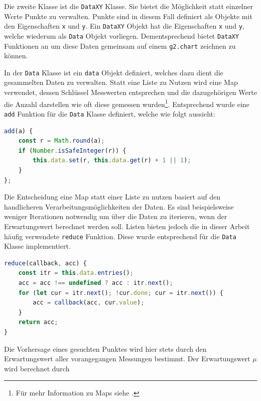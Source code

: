Die zweite Klasse ist die \lstinline{DataXY} Klasse.
Sie bietet die Möglichkeit statt einzelner Werte Punkte zu verwalten.
Punkte sind in diesem Fall definiert als Objekte mit den Eigenschaften \lstinline{x} und \lstinline{y}.
Ein \lstinline{DataXY} Objekt hat die Eigenschaften \lstinline{x} und \lstinline{y}, welche wiederum als \lstinline{Data} Objekt vorliegen.
Dementsprechend bietet \lstinline{DataXY} Funktionen an um diese Daten gemeinsam auf einem \lstinline{g2.chart} zeichnen zu können.

In der \lstinline{Data} Klasse ist ein \lstinline{data} Objekt definiert, welches dazu dient die gesammelten Daten zu verwalten.
Statt eine Liste zu Nutzen wird eine Map verwendet, dessen Schlüssel Messwerten entsprechen und die dazugehörigen Werte die Anzahl darstellen wie oft diese gemessen wurden\footnote{Für mehr Information zu Maps siehe .}.
Entsprechend wurde eine \lstinline{add} Funktion für die \lstinline{Data} Klasse definiert, welche wie folgt aussieht:

\begin{lstlisting}[language=JavaScript, caption={Definition der \lstinline{add} Funktion welche dazu genutzt wird der \lstinline{Data} Klasse neue Werte hinzuzufügen}, label={lst:data_add}]
add(a) {
    const r = Math.round(a);
    if (Number.isSafeInteger(r)) {
        this.data.set(r, this.data.get(r) + 1 || 1);
    }
};
\end{lstlisting}

Die Entscheidung eine Map statt einer Liste zu nutzen basiert auf den handlicheren Verarbeitungsmöglichkeiten der Daten.
Es sind beispielsweise weniger Iterationen notwendig um über die Daten zu iterieren, wenn der Erwartungswert berechnet werden soll.
Listen bieten jedoch die in dieser Arbeit häufig verwendete \lstinline{reduce} Funktion.
Diese wurde entsprechend für die \lstinline{Data} Klasse implementiert.

\begin{lstlisting}[language=JavaScript, caption={Definition der \lstinline{reduce} Funktion um die Standardfunktion der Liste nachzubilden}, label={lst:data_reduce}]
reduce(callback, acc) {
    const itr = this.data.entries();
    acc = acc !== undefined ? acc : itr.next();
    for (let cur = itr.next(); !cur.done; cur = itr.next()) {
        acc = callback(acc, cur.value);
    }
    return acc;
}
\end{lstlisting}

Die Vorhersage eines gesuchten Punktes wird hier stets durch den Erwartungswert aller vorangegangen Messungen bestimmt.
Der Erwartungswert $\mu$ wird berechnet durch~\cite[S.~143]{KlausEden2014}

